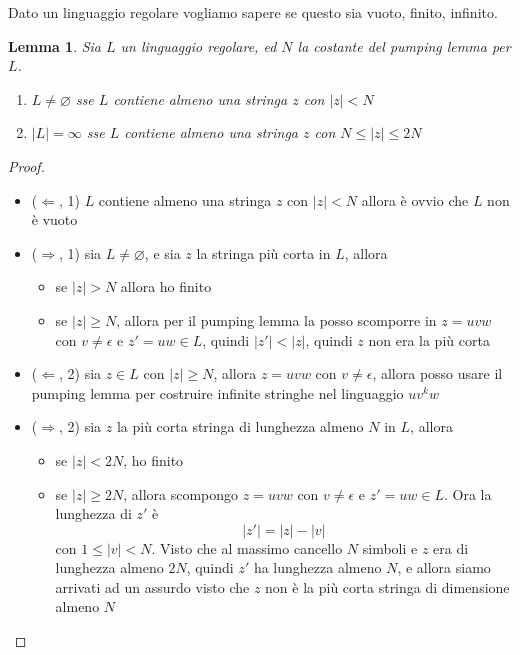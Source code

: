 \documentclass[12pt]{article}
\newtheorem{lemma}{Lemma}
\begin{document}
Dato un linguaggio regolare vogliamo sapere se questo sia vuoto, finito, infinito.
\begin{lemma}
	Sia $L$ un linguaggio regolare, ed $N$ la costante del pumping lemma per $L$.
	\begin{enumerate}
		\item $L \neq \varnothing$ sse $L$ contiene almeno una stringa $z$ con $|z| < N$
		\item $|L| = \infty$ sse $L$  contiene almeno una stringa $z$ con $N \leq |z| \leq 2N$
	\end{enumerate}
\end{lemma}
\begin{proof}
	\begin{itemize}
		\item ($\Leftarrow$, 1) $L$ contiene almeno una stringa $z$ con $|z| < N$ allora è ovvio che $L$ non è vuoto
		\item ($\Rightarrow$, 1) sia $L \neq \varnothing$, e sia $z$ la stringa più corta in $L$, allora
			\begin{itemize}
				\item se $|z| > N$ allora ho finito
				\item se $|z| \geq N$, allora per il pumping lemma la posso scomporre in $z = uvw$ con $v \neq \epsilon$ e $z' = uw \in L$, quindi $|z'| < |z|$, quindi $z$ non era la più corta
			\end{itemize}
		\item ($\Leftarrow$, 2) sia $z \in L$ con $|z| \geq N$, allora $z = uvw$ con $v \neq \epsilon$, allora posso usare il pumping lemma per costruire infinite stringhe nel linguaggio $uv^kw$
		\item ($\Rightarrow$, 2) sia $z$ la più corta stringa di lunghezza almeno $N$ in $L$, allora
			\begin{itemize}
				\item se $|z| < 2N$, ho finito
				\item se $|z| \geq 2N$, allora scompongo $z = uvw$ con $v \neq \epsilon$ e $z' = uw \in L$.
					Ora la lunghezza di $z'$ è 
					$$ |z'| = |z| - |v| $$
					con $1 \leq |v| < N$.
					Visto che al massimo cancello $N$ simboli e $z$ era di lunghezza almeno $2N$, quindi $z'$ ha lunghezza almeno $N$, e allora siamo arrivati ad un assurdo visto che $z$ non è la più corta stringa di dimensione almeno $N$
			\end{itemize}
	\end{itemize}
\end{proof}
\end{document}
